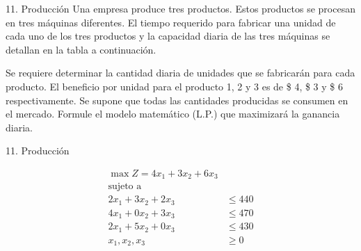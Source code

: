 




\begin{frameExample}{11. Producción}{}
  Una empresa produce tres productos. Estos productos se procesan en tres máquinas diferentes. El tiempo requerido para fabricar una unidad de cada uno de los tres productos y la capacidad diaria de las tres máquinas se detallan en la tabla a continuación.

  {\centering
    \par}
  
  

   Se requiere determinar la cantidad diaria de unidades que se fabricarán para cada producto. El beneficio por unidad para el producto 1, 2 y 3 es de \$ 4, \$ 3 y \$ 6 respectivamente. Se supone que todas las cantidades producidas se consumen en el mercado. Formule el modelo matemático (L.P.) que maximizará la ganancia diaria.
\end{frameExample}

\begin{frameExample}{11. Producción}{}


      \begin{align*}
      \max Z = 4x_1 + 3x_2 + 6x_3 & \\[3mm]
      \text{sujeto a } & \\[2mm]
    2x_1 + 3x_2 + 2x_3 & \leq 440\\
    4x_1 + 0x_2 + 3x_3 & \leq 470\\
    2x_1 + 5x_2  + 0x_3& \leq 430\\[5mm]
    x_1, x_2,x_3 & \geq 0
  \end{align*}
\end{frameExample}



